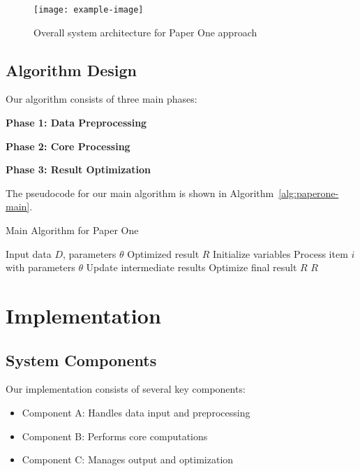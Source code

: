 \begin{figure}[!htb]
    \centering
    \texttt{[image: example-image]}
    \caption{Overall system architecture for Paper One approach}
    \label{fig:paperone-architecture}
\end{figure}

\lipsum[5-6]

\subsection{Algorithm Design}

Our algorithm consists of three main phases:

\textbf{Phase 1: Data Preprocessing}
\lipsum[7]

\textbf{Phase 2: Core Processing}
\lipsum[8]

\textbf{Phase 3: Result Optimization}
\lipsum[9]

The pseudocode for our main algorithm is shown in Algorithm~\ref{alg:paperone-main}.

\begin{algorithm}
\caption{Main Algorithm for Paper One}
\label{alg:paperone-main}
\begin{algorithmic}[1]
\Require Input data $D$, parameters $\theta$
\Ensure Optimized result $R$
\State Initialize variables
    \State Process item $i$ with parameters $\theta$
    \State Update intermediate results
\EndFor
\State Optimize final result $R$
\State \Return $R$
\end{algorithmic}
\end{algorithm}

\section{Implementation}

\subsection{System Components}

Our implementation consists of several key components:

\begin{itemize}
    \item Component A: Handles data input and preprocessing
    \item Component B: Performs core computations
    \item Component C: Manages output and optimization
\end{itemize}

